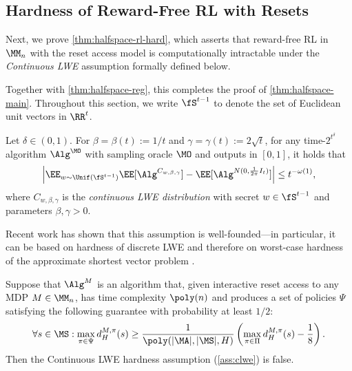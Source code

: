 \subsection{Hardness of Reward-Free RL with Resets}\label{sec:halfspace-hardness}

Next, we prove \cref{thm:halfspace-rl-hard}, which asserts that reward-free RL in $\MM_n$ with the reset access model is computationally intractable under the \emph{Continuous LWE} assumption formally defined below.


Together with \cref{thm:halfspace-reg}, this completes the proof of \cref{thm:halfspace-main}. Throughout this section, we write $\fS^{t-1}$ to denote the set of Euclidean unit vectors in $\RR^t$.

\begin{assumption}\label{ass:clwe}
Let $\delta \in (0,1)$. For $\beta = \beta(t) := 1/t$ and $\gamma = \gamma(t) := 2\sqrt{t}$, for any time-$2^{t^\delta}$ algorithm $\Alg^\MO$ with sampling oracle $\MO$ and outputs in $[0,1]$, it holds that
\[\left|\EE_{w\sim\Unif(\fS^{t-1})} \EE[\Alg^{C_{w,\beta,\gamma}}] - \EE[\Alg^{N(0,\frac{1}{2\pi}I_t)}]\right| \leq t^{-\omega(1)},\]
where $C_{w,\beta,\gamma}$ is the \emph{continuous LWE distribution} with secret $w \in \fS^{t-1}$ and parameters $\beta,\gamma>0$.
\end{assumption}

Recent work has shown that this assumption is well-founded---in particular, it can be based on hardness of discrete LWE \citep{gupte2022continuous} and therefore on worst-case hardness of the approximate shortest vector problem \citep{brakerski2013classical}.

\begin{theorem}
  \label{thm:halfspace-rl-hard}
Suppose that $\Alg^M$ is an algorithm that, given interactive reset access to any MDP $M \in \MM_n$, has time complexity $\poly(n)$ and produces a set of policies $\Psi$ satisfying the following guarantee with probability at least $1/2$:
\begin{equation}\forall s \in \MS: \max_{\pi\in\Psi} d^{M,\pi}_H(s) \geq \frac{1}{\poly(|\MA|, |\MS|, H)} \left(\max_{\pi\in\Pi} d^{M,\pi}_H(s) - \frac{1}{8}\right).\label{eq:genblock-cover}\end{equation}
Then the Continuous LWE hardness assumption (\cref{ass:clwe}) is false. %
\end{theorem}

